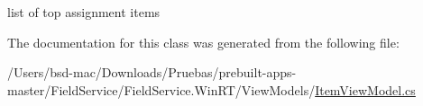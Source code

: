 list of top assignment items 



The documentation for this class was generated from the following file\+:\begin{DoxyCompactItemize}
\item 
/\+Users/bsd-\/mac/\+Downloads/\+Pruebas/prebuilt-\/apps-\/master/\+Field\+Service/\+Field\+Service.\+Win\+R\+T/\+View\+Models/\hyperlink{_win_r_t_2_view_models_2_item_view_model_8cs}{Item\+View\+Model.\+cs}\end{DoxyCompactItemize}
